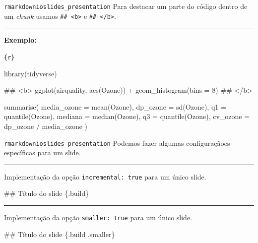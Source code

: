 \documentclass[
  10pt,
  ignorenonframetext,
]{beamer}
\newenvironment{Shaded}{\begin{snugshade}}{\end{snugshade}}
\newcommand{\FunctionTok}[1]{\textcolor[rgb]{0.28,0.35,0.67}{#1}}
\newcommand{\NormalTok}[1]{\textcolor[rgb]{0.00,0.23,0.31}{#1}}
\newcommand*{\regrafina}{\rule{\textwidth}{0.5pt}}
\begin{document}
\begin{frame}[fragile]{\texttt{rmarkdown}\newline \texttt{ioslides\_presentation}}
\protect\hypertarget{rmarkdownioslides_presentation-5}{}
Para destacar um parte do código dentro de um \emph{chunk} usamos
\texttt{\#\#\ \textless{}b\textgreater{}} e
\texttt{\#\#\ \textless{}/b\textgreater{}}.

\regrafina

\textbf{Exemplo:}

\small

\texttt{\textasciigrave{}\textasciigrave{}\textasciigrave{}\{r\}}

\begin{Shaded}
\begin{Highlighting}[]
\NormalTok{library(tidyverse)}

\NormalTok{\#\# \textless{}b\textgreater{}}
\NormalTok{ggplot(airquality, aes(Ozone)) + geom\_histogram(bins = 8)}
\NormalTok{\#\# \textless{}/b\textgreater{}}

\NormalTok{summarise(}
\NormalTok{  media\_ozone = mean(Ozone), dp\_ozone = sd(Ozone),}
\NormalTok{  q1 = quantile(Ozone), mediana = median(Ozone),}
\NormalTok{  q3 = quantile(Ozone), cv\_ozone = dp\_ozone / media\_ozone}
\NormalTok{)}
\end{Highlighting}
\end{Shaded}

\texttt{\textasciigrave{}\textasciigrave{}\textasciigrave{}}

\normalsize
\end{frame}

\begin{frame}[fragile]{\texttt{rmarkdown}\newline \texttt{ioslides\_presentation}}
\protect\hypertarget{rmarkdownioslides_presentation-6}{}
Podemos fazer algumas configuraçãoes específicas para um slide.

\regrafina

Implementação da opção \texttt{incremental:\ true} para um único slide.

\begin{Shaded}
\begin{Highlighting}[]
\FunctionTok{\#\# Título do slide \{.build\}}
\end{Highlighting}
\end{Shaded}

\regrafina

Implementação da opção \texttt{smaller:\ true} para um único slide.

\begin{Shaded}
\begin{Highlighting}[]
\FunctionTok{\#\# Título do slide \{.build .smaller\}}
\end{Highlighting}
\end{Shaded}
\end{frame}
\end{document}
